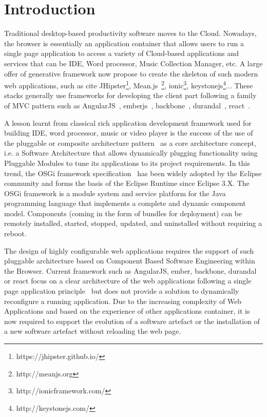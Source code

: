\section{Introduction}

Traditional desktop-based productivity software moves to the Cloud. 
Nowadays, the browser is essentially an application container that allows users to run a single page application to  access a variety of Cloud-based applications and services that can be IDE, Word processor, Music Collection Manager, etc. 
A large offer of generative framework now propose to create the skeleton of such modern web applications, such as cite JHipster\footnote{https://jhipster.github.io/}, Mean.js~\footnote{http://meanjs.org}, ionic\footnote{http://ionicframework.com/}, keystonejs\footnote{http://keystonejs.com/}... 
These stacks generally use frameworks for developing the client part following a family of MVC pattern such as AngularJS~\cite{green2013angularjs}, emberjs~\cite{cravens2014building}, backbone~\cite{osmani2013developing}, durandal~\cite{monteiro2014learning}, react~\cite{fedosejev2015react}.  

A lesson learnt from classical rich application development framework used for building IDE, word processor, music or video player is the success of the use of the pluggable or composite architecture pattern~\cite{115158,schmidt2013pattern} as a core architecture concept,  i.e. a Software Architecture that allows dynamically plugging functionality using Pluggable Modules to tune its applications to its project requirements. In this trend, the OSGi framework specification~\cite{hall2011osgi} has been widely adopted by the Eclipse community and forms the basis of the Eclipse Runtime since Eclipse 3.X. The OSGi framework is a module system and service platform for the Java programming language that implements a complete and dynamic component model. Components (coming in the form of bundles for deployment) can be remotely installed, started, stopped, updated, and uninstalled without requiring a reboot.  

The design of highly configurable web applications requires the support of such pluggable architecture based on Component Based Software Engineering within the Browser. Current framework such as AngularJS, ember, backbone, durandal or react focus on a clear architecture of the web applications following a single page application principle~\cite{monteiro2014learning} but does not provide a solution to dynamically reconfigure a running application. Due to the increasing complexity of Web Applications and based on the experience of other applications container, it is now required to support the evolution of a software artefact or the installation of a new software artefact without reloading the web page.  

